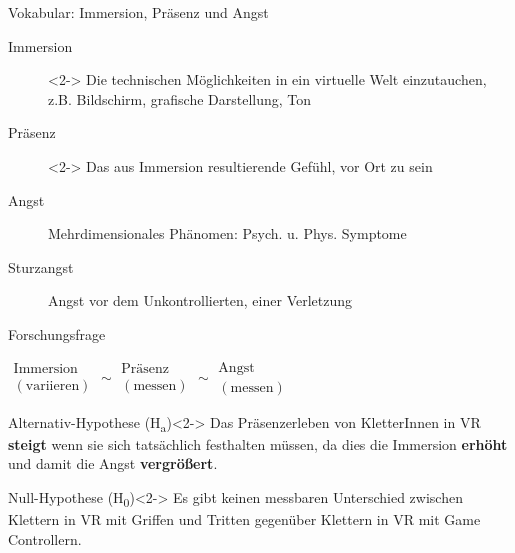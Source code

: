 \documentclass[11pt,aspectratio=169,
xcolor={table},
hyperref={
hidelinks,
pdfauthor={Peter Schulz},
pdftitle={Infromatik am Abgrund - Klettern in Virtueller Realität},
pdfsubject={Master Thesis},
pdfkeywords={Sport Climbing;Virtual Reality;Mixed Reality;Passive Haptics;Presence},
pdfencoding=auto},
url={obeyspaces,spaces,hyphens}]{beamer}
\theoremstyle{plain}
\begin{document}
\begin{frame}{Vokabular: Immersion, Präsenz und Angst}
\begin{description}
	\item[Immersion]<2-> Die technischen Möglichkeiten in ein virtuelle Welt einzutauchen,\\z.B. Bildschirm, grafische Darstellung, Ton \autocite{McMahan2003}
	\item[Präsenz]<2-> Das aus Immersion resultierende Gefühl, vor Ort zu sein \autocite{McMahan2003}
	\item[Angst] Mehrdimensionales Phänomen: Psych. u. Phys. Symptome \autocite{Krohne1996}
	\item[Sturzangst] Angst vor dem Unkontrollierten, einer Verletzung \autocite{Lewis2010}
\end{description}
\begin{center}
\end{center}
\end{frame}

\begin{frame}{Forschungsfrage}
\begin{center}
\LARGE
$\substack{\text{Immersion}\\(\text{variieren})} \sim \substack{\text{Präsenz}\\(\text{messen})} \sim \substack{\text{Angst}\\(\text{messen})}$
\end{center}
\begin{center}
\begin{minipage}{0.7\textwidth}
	\begin{block}{Alternativ-Hypothese (H\textsubscript{a}\label{hyp:anxiety})}<2->
		Das \textcolor{tertiary}{Präsenz}erleben von KletterInnen in \gls{VR} \textbf{steigt} wenn sie sich tatsächlich festhalten müssen, da dies die \textcolor{tertiary}{Immersion} \textbf{erhöht} und damit die \textcolor{tertiary}{Angst} \textbf{vergrößert}.
	\end{block}
	\begin{block}{Null-Hypothese (H\textsubscript{0}\label{hyp:anxiety})}<2->
		Es gibt keinen messbaren Unterschied zwischen Klettern in \gls{VR} mit \textcolor{tertiary}{Griffen und Tritten} gegenüber Klettern in \gls{VR} mit \textcolor{tertiary}{Game Controllern}.
	\end{block}
\end{minipage}
\end{center}
\end{frame}
\end{document}
